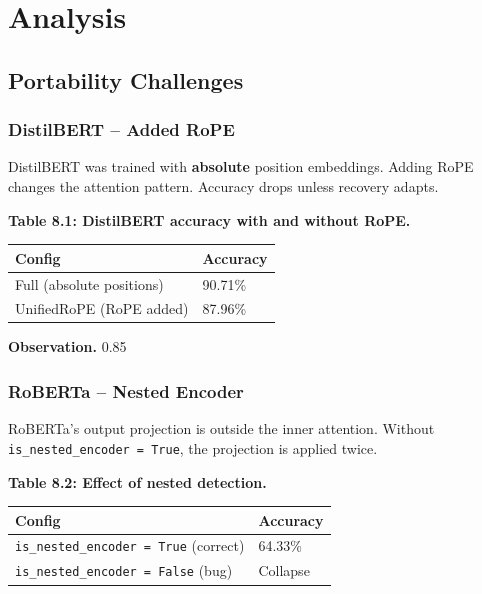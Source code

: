 
\section{Analysis}

\subsection{Portability Challenges}

\subsubsection{DistilBERT -- Added RoPE}

DistilBERT was trained with \textbf{absolute} position embeddings. Adding RoPE 
changes the attention pattern. Accuracy drops unless recovery adapts.

\textbf{Table 8.1: DistilBERT accuracy with and without RoPE.}

\begin{table}[H]
\centering
\small
\begin{tabular}{ll}
\toprule
\textbf{Config} & \textbf{Accuracy} \\
\midrule
Full (absolute positions) & 90.71\% \\
UnifiedRoPE (RoPE added) & 87.96\% \\
\bottomrule
\end{tabular}
\end{table}

\textbf{Observation.} 0.85

\subsubsection{RoBERTa -- Nested Encoder}

RoBERTa's output projection is outside the inner attention. Without 
\texttt{is\_nested\_encoder = True}, the projection is applied twice.

\textbf{Table 8.2: Effect of nested detection.}

\begin{table}[H]
\centering
\small
\begin{tabular}{ll}
\toprule
\textbf{Config} & \textbf{Accuracy} \\
\midrule
\texttt{is\_nested\_encoder = True} (correct) & 64.33\% \\
\texttt{is\_nested\_encoder = False} (bug) & Collapse \\
\bottomrule
\end{tabular}
\end{table}

